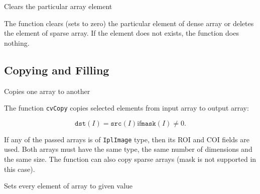 Clears the particular array element


\begin{description}
\end{description}


The function  clears (sets to zero) the particular element of dense array or deletes the element of sparse array. If the element does not exists, the function does nothing.


\subsection{Copying and Filling}



Copies one array to another


\begin{description}
\end{description}


The function \texttt{cvCopy} copies selected elements from input array to output array:

\[
\texttt{dst}(I)=\texttt{src}(I) \text{if} \texttt{mask}(I) \ne 0.
\]

If any of the passed arrays is of \texttt{IplImage} type, then its ROI
and COI fields are used. Both arrays must have the same type, the same
number of dimensions and the same size. The function can also copy sparse
arrays (mask is not supported in this case).


Sets every element of array to given value


\begin{description}
\end{description}


